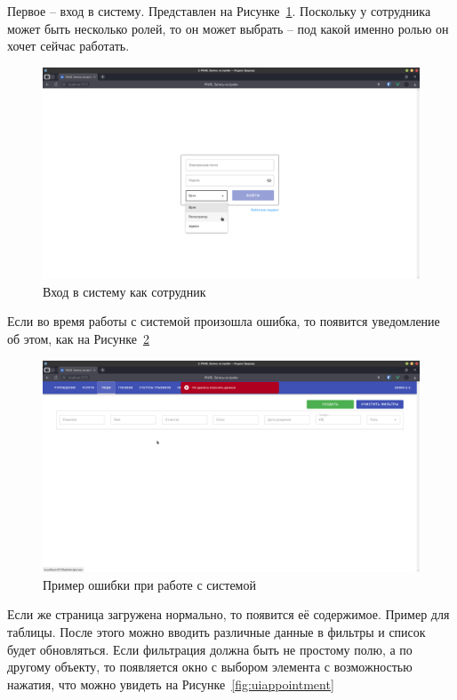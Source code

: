 \documentclass[a4paper,article]{article}
\begin{document}
\begin{sloppypar}
    Первое -- вход в систему. Представлен на Рисунке~\ref{fig:uilogin}. Поскольку у сотрудника может быть несколько ролей, то он может выбрать -- под какой именно ролью он хочет сейчас работать.
    
    \begin{figure}[h]
        \centering
        \includegraphics[width=0.8\linewidth]{UI. Вход как сотрудник.png}        
        \caption{\centering Вход в систему как сотрудник}        
        \label{fig:uilogin}        
    \end{figure}
    
    \newpage
    
    Если во время работы с системой произошла ошибка, то появится уведомление об этом, как на Рисунке~\ref{fig:uierror}
    
    \begin{figure}[h]
        \centering
        \includegraphics[width=0.8\linewidth]{UI. Пример ошибки.png}        
        \caption{\centering Пример ошибки при работе с системой}        
        \label{fig:uierror}        
    \end{figure}
    
    Если же страница загружена нормально, то появится её содержимое. Пример для таблицы. После этого можно вводить различные данные в фильтры и список будет обновляться. Если фильтрация должна быть не простому полю, а по другому объекту, то появляется окно с выбором элемента с возможностью нажатия, что можно увидеть на Рисунке~\ref{fig:uiappointment}
    

\end{sloppypar}
\end{document}
